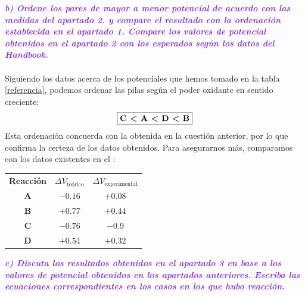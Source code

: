 \noindent\textcolor{BlueViolet}{\textbf{\textit{b) Ordene los pares de mayor a menor potencial de acuerdo con las medidas del apartado 2. y compare el resultado con la ordenación establecida en el apartado 1. Compare los valores de potencial obtenidos en el apartado 2 con los esperados según los datos del Handbook.}}}\\\\
\noindent Siguiendo los datos acerca de los potenciales que hemos tomado en la tabla \ref{referencia}, podemos ordenar las pilas según el poder oxidante en sentido creciente:
\[\textbf{\boxed{\text{C <\ A <\ D <\ B}}}\]
Esta ordenación concuerda con la obtenida en la cuestión anterior, por lo que confirma la certeza de los datos obtenidos. Para asegurarnos más, comparamos con los datos existentes en el :
\begin{table}[H]
\centering
\begin{tabular}{ccc}
\rowcolor[HTML]{9698ED} 
\textbf{Reacción} & \textbf{$\Delta V_{\text{teórico}}$} & \cellcolor[HTML]{9698ED}\textbf{$\Delta V_{\text{experimental}}$} \\
\rowcolor[HTML]{DAE8FC} 
\textbf{A} & $-0.16$ & $+0.08$ \\
\rowcolor[HTML]{FFFFFF} 
\textbf{B} & $+0.77$ & $+0.44$ \\
\rowcolor[HTML]{DAE8FC} 
\textbf{C} & $-0.76$ & $-0.9$ \\
\textbf{D} & $+0.54$ & $+0.32$
\end{tabular}
\label{pot5}
\end{table}
\noindent\textcolor{BlueViolet}{\textbf{\textit{c) Discuta los resultados obtenidos en el apartado 3 en base a los valores de potencial obtenidos en los apartados anteriores. Escriba las ecuaciones correspondientes en los casos en los que hubo reacción.}}}

